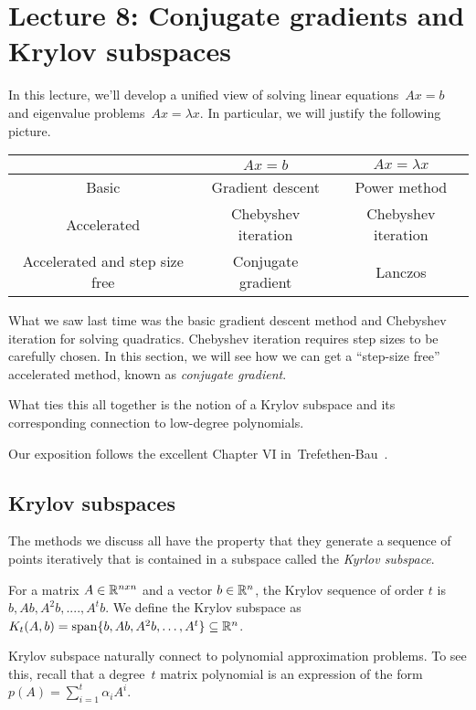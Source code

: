 
\section{Lecture 8: Conjugate gradients and Krylov subspaces}

In this lecture, we'll develop a unified view of solving linear equations~$Ax=b$
and eigenvalue problems~$Ax=\lambda x.$ In particular, we will justify the
following picture.
%
\begin{center}
\begin{tabular}{ | c |c| c | } 
\hline
 & $Ax=b$ & $Ax=\lambda x$ \\ 
\hline
Basic & Gradient descent & Power method \\ 
\hline
Accelerated & Chebyshev iteration & Chebyshev iteration \\
\hline
Accelerated and step size free & Conjugate gradient & Lanczos \\
\hline
\end{tabular}
\end{center}

What we saw last time was the basic gradient descent method and Chebyshev
iteration for solving quadratics. Chebyshev iteration requires step sizes to be
carefully chosen. In this section, we will see how we can get a ``step-size
free'' accelerated method, known as \emph{conjugate gradient}.

What ties this all together is the notion of a Krylov subspace and its
corresponding connection to low-degree polynomials.

Our exposition follows the excellent Chapter VI
in~Trefethen-Bau~\cite{trefethen97}.

\subsection{Krylov subspaces}
%
The methods we discuss all have the property that they generate a sequence of
points iteratively that is contained in a subspace called the \emph{Kyrlov
subspace}.
%
\begin{definition}
For a matrix $A \in \mathbb{R}^{n x n}$ and a vector $b \in \mathbb{R}^n$, 
the Krylov sequence of order $t$ is $b, Ab, A^2b, ...., A^tb$. 
We define the Krylov subspace as
$K_t(A,b)=\mathrm{span}\{b, Ab, A^2b, \ldots, A^t\} \subseteq \mathbb{R}^n$. 
\end{definition}

Krylov subspace naturally connect to polynomial approximation problems.
To see this, recall that a degree~$t$ matrix polynomial is an expression of the form
$p(A)=\sum_{i=1}^t \alpha_i A^i.$ 

